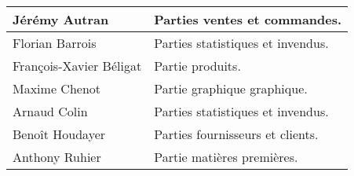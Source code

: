     \begin{center}
        \begin{tabular}{|l|l|}
            \hline
                Jérémy Autran & Parties ventes et commandes. \\
            \hline
                Florian Barrois & Parties statistiques et invendus. \\
            \hline
                François-Xavier Béligat & Partie produits. \\
            \hline
                Maxime Chenot & Partie graphique graphique. \\
            \hline
                Arnaud Colin & Parties statistiques et invendus. \\
            \hline
                Benoît Houdayer & Parties fournisseurs et clients. \\
            \hline
                Anthony Ruhier & Partie matières premières. \\
            \hline
        \end{tabular}
    \end{center}



